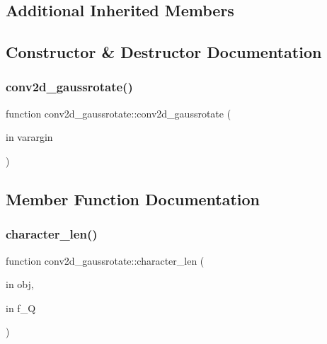 \subsection*{Additional Inherited Members}


\subsection{Constructor \& Destructor Documentation}
\mbox{\label{classconv2d__gaussrotate_a227474d85844e3457bc45b6a71026826}} 
\subsubsection{\texorpdfstring{conv2d\+\_\+gaussrotate()}{conv2d\_gaussrotate()}}
{\footnotesize\ttfamily function conv2d\+\_\+gaussrotate\+::conv2d\+\_\+gaussrotate (\begin{DoxyParamCaption}\item[{in}]{varargin }\end{DoxyParamCaption})}



\subsection{Member Function Documentation}
\mbox{\label{classconv2d__gaussrotate_a455e3b10962c29d1a5e19eaaf27ee8c0}} 
\subsubsection{\texorpdfstring{character\+\_\+len()}{character\_len()}}
{\footnotesize\ttfamily function conv2d\+\_\+gaussrotate\+::character\+\_\+len (\begin{DoxyParamCaption}\item[{in}]{obj,  }\item[{in}]{f\+\_\+Q }\end{DoxyParamCaption})\hspace{0.3cm}{\ttfamily [virtual]}}



